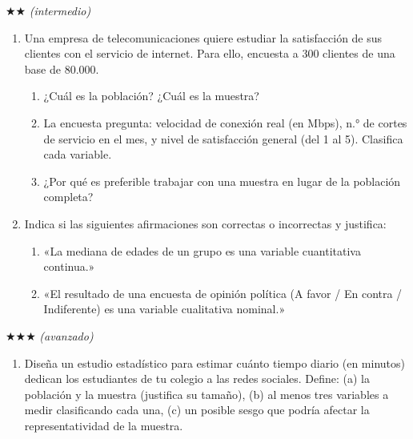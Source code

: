 \documentclass[11pt, letterpaper]{article}
\newcommand{\seccionheader}[2]{%
  \vspace{1.6em}
  \noindent{\Large\bfseries\color{#1} #2}\par
  \vspace{0.4em}{\noindent\color{#1}\rule{\linewidth}{0.8pt}}
  \vspace{1.0em}}
\begin{document}
$\bigstar\bigstar$ \textit{(intermedio)}

\begin{enumerate}[label=\textbf{\arabic*.}, leftmargin=*, resume]
  \item Una empresa de telecomunicaciones quiere estudiar la satisfacción de sus clientes con el servicio de internet. Para ello, encuesta a 300 clientes de una base de 80.000.
  \begin{enumerate}[label=\alph*)]
    \item ¿Cuál es la población? ¿Cuál es la muestra?
    \item La encuesta pregunta: velocidad de conexión real (en Mbps), n.° de cortes de servicio en el mes, y nivel de satisfacción general (del 1 al 5). Clasifica cada variable.
    \item ¿Por qué es preferible trabajar con una muestra en lugar de la población completa?
  \end{enumerate}

  \item Indica si las siguientes afirmaciones son correctas o incorrectas y justifica:
  \begin{enumerate}[label=\alph*)]
    \item «La mediana de edades de un grupo es una variable cuantitativa continua.»
    \item «El resultado de una encuesta de opinión política (A favor / En contra / Indiferente) es una variable cualitativa nominal.»
  \end{enumerate}
\end{enumerate}

$\bigstar\bigstar\bigstar$ \textit{(avanzado)}

\begin{enumerate}[label=\textbf{\arabic*.}, leftmargin=*, resume]
  \item Diseña un estudio estadístico para estimar cuánto tiempo diario (en minutos) dedican los estudiantes de tu colegio a las redes sociales. Define: (a) la población y la muestra (justifica su tamaño), (b) al menos tres variables a medir clasificando cada una, (c) un posible sesgo que podría afectar la representatividad de la muestra.
  \vspace{3.5cm}
\end{enumerate}

\clearpage
\seccionheader{blockb}{Sección 2 $\cdot$ Tablas de frecuencia}
\label{sec:2}
\end{document}
